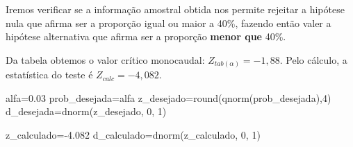 \documentclass[
]{book}
\newenvironment{Shaded}{\begin{snugshade}}{\end{snugshade}}
\newcommand{\DecValTok}[1]{\textcolor[rgb]{0.00,0.00,0.81}{#1}}
\newcommand{\FloatTok}[1]{\textcolor[rgb]{0.00,0.00,0.81}{#1}}
\newcommand{\FunctionTok}[1]{\textcolor[rgb]{0.00,0.00,0.00}{#1}}
\newcommand{\NormalTok}[1]{#1}
\newcommand{\OtherTok}[1]{\textcolor[rgb]{0.56,0.35,0.01}{#1}}
\newcommand{\SpecialCharTok}[1]{\textcolor[rgb]{0.00,0.00,0.00}{#1}}
\begin{document}
\hfill\break

Iremos verificar se a informação amostral obtida nos permite rejeitar a hipótese nula que afirma ser a proporção igual ou maior a 40\%, fazendo então valer a hipótese alternativa que afirma ser a proporção \textbf{menor que} 40\%.

\hfill\break

Da tabela obtemos o valor crítico monocaudal: \(Z_{tab\left(\alpha\right)}=-1,88\). Pelo cálculo, a estatística do teste é \(Z_{calc}=-4,082\).

\hfill\break

\begin{Shaded}
\begin{Highlighting}[]
\NormalTok{alfa}\OtherTok{=}\FloatTok{0.03}
\NormalTok{prob\_desejada}\OtherTok{=}\NormalTok{alfa}
\NormalTok{z\_desejado}\OtherTok{=}\FunctionTok{round}\NormalTok{(}\FunctionTok{qnorm}\NormalTok{(prob\_desejada),}\DecValTok{4}\NormalTok{)}
\NormalTok{d\_desejada}\OtherTok{=}\FunctionTok{dnorm}\NormalTok{(z\_desejado, }\DecValTok{0}\NormalTok{, }\DecValTok{1}\NormalTok{)}

\NormalTok{z\_calculado}\OtherTok{=}\SpecialCharTok{{-}}\FloatTok{4.082}
\NormalTok{d\_calculado}\OtherTok{=}\FunctionTok{dnorm}\NormalTok{(z\_calculado, }\DecValTok{0}\NormalTok{, }\DecValTok{1}\NormalTok{)}





\end{Highlighting}
\end{Shaded}
\end{document}
